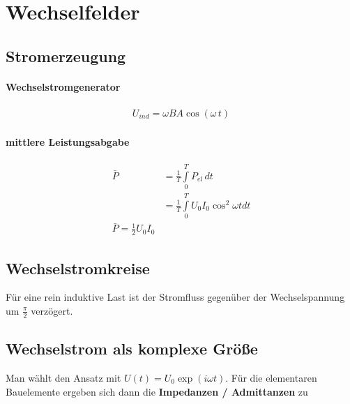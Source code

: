 \newpage
\section{Wechselfelder}

\subsection{Stromerzeugung}
\paragraph{Wechselstromgenerator}
\begin{align} \label{eqn:Wechselstromgenerator}
U_{ind} = \omega B  A \cos \left( \omega \, t \right)
\end{align}

\paragraph{mittlere Leistungsabgabe}
\begin{align} \label{eqn:Leistung}
\bar{P} &= \frac{1}{T} \int \limits_0^T P_{el} \, dt \\
		&= \frac{1}{T} \int \limits_0^T U_0 I_0 \cos^2 \omega t dt \\
\boxed{\bar{P}	= \frac{1}{2} U_0 I_0}
\end{align}

\subsection{Wechselstromkreise}
Für eine rein induktive Last ist der Stromfluss gegenüber der Wechselspannung um $\frac{\pi}{2} $ verzögert.

\subsection{Wechselstrom als komplexe Größe}
Man wählt den Ansatz mit $U(t) = U_0 \exp (i \omega t) $.
Für die elementaren Bauelemente ergeben sich dann  die\textbf{ Impedanzen / Admittanzen} zu
\par {}

